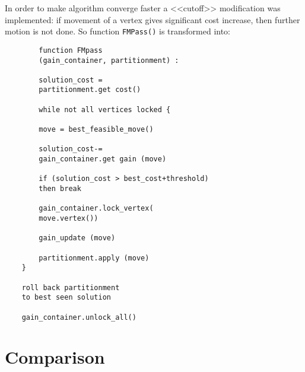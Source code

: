\documentclass[12pt,a4paper,twocolumn]{article}
\begin{document}
	In order to make algorithm converge faster a <<cutoff>> modification was implemented: if movement of a vertex gives significant cost increase, then further motion is not done. So function \texttt{FMPass()} is transformed into:
	\begin{verbatim}
		function FMpass
		(gain_container, partitionment) :
		
		solution_cost = 
		partitionment.get cost()
		
		while not all vertices locked {
		
		move = best_feasible_move()
		
		solution_cost-= 
		gain_container.get gain (move)
		
		if (solution_cost > best_cost+threshold)
		then break
		
		gain_container.lock_vertex(
		move.vertex())
		
		gain_update (move)
		
		partitionment.apply (move)
	}
	
	roll back partitionment 
	to best seen solution
	
	gain_container.unlock_all()

	\end{verbatim}
	
	\section{Comparison}
	
\end{document}
